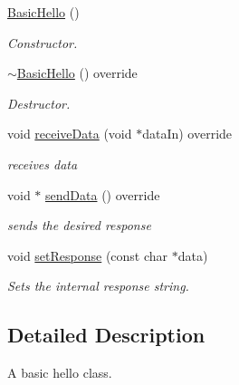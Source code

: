 \begin{DoxyCompactItemize}
\item 
\mbox{\label{classBasicHelloServer_1_1BasicHello_ab57094a6104237e63759bbcb6633a96e}} 
\mbox{\hyperlink{classBasicHelloServer_1_1BasicHello_ab57094a6104237e63759bbcb6633a96e}{Basic\+Hello}} ()
\begin{DoxyCompactList}\small\item\em Constructor. \end{DoxyCompactList}\item 
\mbox{\label{classBasicHelloServer_1_1BasicHello_a730b8a4bf8185d49b01adb37a1d0a8d0}} 
\mbox{\hyperlink{classBasicHelloServer_1_1BasicHello_a730b8a4bf8185d49b01adb37a1d0a8d0}{$\sim$\+Basic\+Hello}} () override
\begin{DoxyCompactList}\small\item\em Destructor. \end{DoxyCompactList}\item 
void \mbox{\hyperlink{classBasicHelloServer_1_1BasicHello_a51e08649c1783b6e86ef4d329c85dcad}{receive\+Data}} (void $\ast$data\+In) override
\begin{DoxyCompactList}\small\item\em receives data \end{DoxyCompactList}\item 
void $\ast$ \mbox{\hyperlink{classBasicHelloServer_1_1BasicHello_aec194431ec40a83e40c09b42b3c31065}{send\+Data}} () override
\begin{DoxyCompactList}\small\item\em sends the desired response \end{DoxyCompactList}\item 
void \mbox{\hyperlink{classBasicHelloServer_1_1BasicHello_ad0854e8076b63f77972c125cf4514de4}{set\+Response}} (const char $\ast$data)
\begin{DoxyCompactList}\small\item\em Sets the internal response string. \end{DoxyCompactList}\end{DoxyCompactItemize}


\subsection{Detailed Description}
A basic hello class. 

